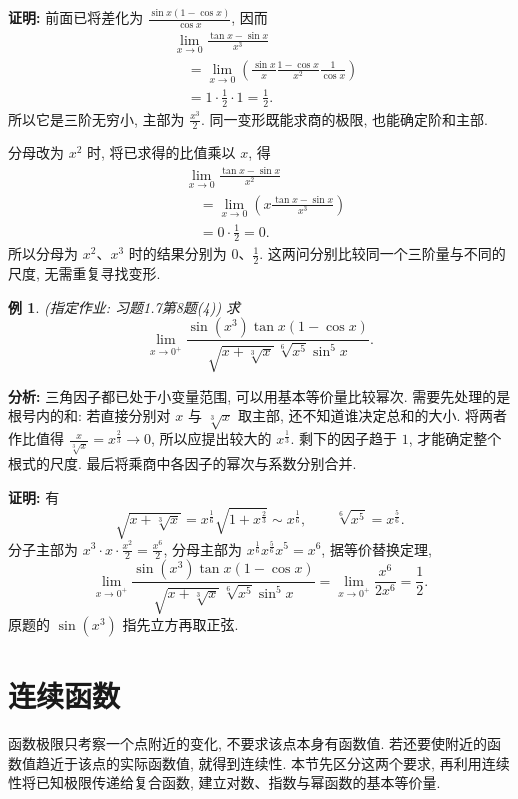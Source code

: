 \documentclass[UTF8,openany]{ctexbook}
\theoremstyle{chinesetextbook}
\newtheorem{example}{例}[section]
\newenvironment{cnproof}{\par\indent\textbf{证明:} \ignorespaces}{\par}
\begin{document}
\begin{cnproof}
前面已将差化为 $\displaystyle\frac{\sin x(1-\cos x)}{\cos x}$, 因而
\[
\begin{aligned}
&\lim_{x\to0}\frac{\tan x-\sin x}{x^3}\\
&\quad=\lim_{x\to0}\left(\frac{\sin x}{x}\frac{1-\cos x}{x^2}\frac1{\cos x}\right)\\
&\quad=1\cdot\frac12\cdot1=\frac12.
\end{aligned}
\]
所以它是三阶无穷小, 主部为 $\displaystyle\frac{x^3}{2}$. 同一变形既能求商的极限, 也能确定阶和主部.

分母改为 $x^2$ 时, 将已求得的比值乘以 $x$, 得
\[
\begin{aligned}
&\lim_{x\to0}\frac{\tan x-\sin x}{x^2}\\
&\quad=\lim_{x\to0}\left(x\frac{\tan x-\sin x}{x^3}\right)\\
&\quad=0\cdot\frac12=0.
\end{aligned}
\]
所以分母为 $x^2$、$x^3$ 时的结果分别为 $0$、$\displaystyle\frac12$. 这两问分别比较同一个三阶量与不同的尺度, 无需重复寻找变形.
\end{cnproof}
\begin{example}
(指定作业: 习题1.7第8题(4)) 求
\[
\lim_{x\to0^+}\frac{\sin(x^3)\tan x(1-\cos x)}{\sqrt{x+\sqrt[3]x}\,\sqrt[6]{x^5}\sin^5x}.
\]
\end{example}
\par\indent\textbf{分析:} 三角因子都已处于小变量范围, 可以用基本等价量比较幂次. 需要先处理的是根号内的和: 若直接分别对 $x$ 与 $\sqrt[3]x$ 取主部, 还不知道谁决定总和的大小. 将两者作比值得 $\displaystyle\frac{x}{\sqrt[3]x}=x^{\frac23}\to0$, 所以应提出较大的 $x^{\frac13}$. 剩下的因子趋于 $1$, 才能确定整个根式的尺度. 最后将乘商中各因子的幂次与系数分别合并.
\begin{cnproof}
有
\[
\sqrt{x+\sqrt[3]x}=x^{\frac16}\sqrt{1+x^{\frac23}}\sim x^{\frac16},
\qquad\sqrt[6]{x^5}=x^{\frac56}.
\]
分子主部为 $\displaystyle x^3\cdot x\cdot\frac{x^2}2=\frac{x^6}2$, 分母主部为 $\displaystyle x^{\frac16}x^{\frac56}x^5=x^6$, 据等价替换定理,
\[
\lim_{x\to0^+}\frac{\sin(x^3)\tan x(1-\cos x)}{\sqrt{x+\sqrt[3]x}\,\sqrt[6]{x^5}\sin^5x}
=\lim_{x\to0^+}\frac{x^6}{2x^6}=\frac12.
\]
原题的 $\sin(x^3)$ 指先立方再取正弦.
\end{cnproof}

\section{连续函数}
函数极限只考察一个点附近的变化, 不要求该点本身有函数值. 若还要使附近的函数值趋近于该点的实际函数值, 就得到连续性. 本节先区分这两个要求, 再利用连续性将已知极限传递给复合函数, 建立对数、指数与幂函数的基本等价量.
\end{document}
